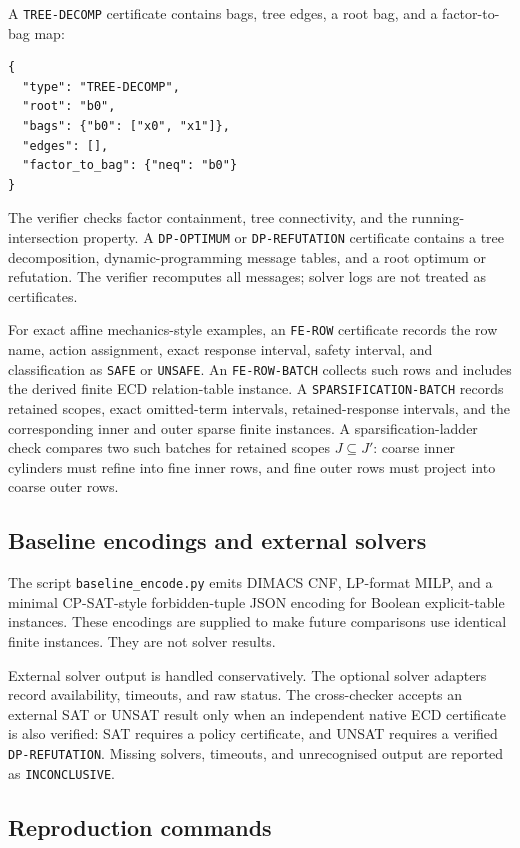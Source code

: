 A \texttt{TREE-DECOMP} certificate contains bags, tree edges, a root bag, and a
factor-to-bag map:
\begin{verbatim}
{
  "type": "TREE-DECOMP",
  "root": "b0",
  "bags": {"b0": ["x0", "x1"]},
  "edges": [],
  "factor_to_bag": {"neq": "b0"}
}
\end{verbatim}
The verifier checks factor containment, tree connectivity, and the
running-intersection property. A \texttt{DP-OPTIMUM} or \texttt{DP-REFUTATION}
certificate contains a tree decomposition, dynamic-programming message tables,
and a root optimum or refutation. The verifier recomputes all messages; solver
logs are not treated as certificates.

For exact affine mechanics-style examples, an \texttt{FE-ROW} certificate records
the row name, action assignment, exact response interval, safety interval, and
classification as \texttt{SAFE} or \texttt{UNSAFE}. An \texttt{FE-ROW-BATCH}
collects such rows and includes the derived finite ECD relation-table instance.
A \texttt{SPARSIFICATION-BATCH} records retained scopes, exact omitted-term
intervals, retained-response intervals, and the corresponding inner and outer
sparse finite instances. A sparsification-ladder check compares two such batches
for retained scopes $J\subseteq J'$: coarse inner cylinders must refine into fine
inner rows, and fine outer rows must project into coarse outer rows.

\subsection{Baseline encodings and external solvers}

The script \texttt{baseline\_encode.py} emits DIMACS CNF, LP-format MILP, and a
minimal CP-SAT-style forbidden-tuple JSON encoding for Boolean explicit-table
instances. These encodings are supplied to make future comparisons use identical
finite instances. They are not solver results.

External solver output is handled conservatively. The optional solver adapters
record availability, timeouts, and raw status. The cross-checker accepts an
external SAT or UNSAT result only when an independent native ECD certificate is
also verified: SAT requires a policy certificate, and UNSAT requires a verified
\texttt{DP-REFUTATION}. Missing solvers, timeouts, and unrecognised output are
reported as \texttt{INCONCLUSIVE}.

\subsection{Reproduction commands}

